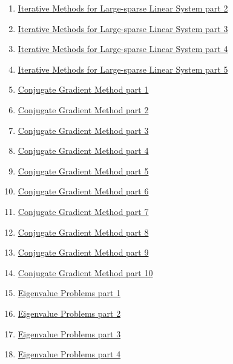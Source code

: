 \documentclass[11pt]{article}
\begin{document}
\begin{enumerate}
	\item \href{https://mp.weixin.qq.com/s/1Dzwvc6YO_hfeI2PSF2t4g}{Iterative Methods for Large-sparse Linear System part 2}	%
	\item \href{https://mp.weixin.qq.com/s/-f-D6MYmhacy6x9Q2EyagA}{Iterative Methods for Large-sparse Linear System part 3}	%
	\item \href{https://mp.weixin.qq.com/s/MeDd214wkrRroG-F_uDLfg}{Iterative Methods for Large-sparse Linear System part 4}	%
	\item \href{https://mp.weixin.qq.com/s/peWYPbvlArAoLjfw2SuaPw}{Iterative Methods for Large-sparse Linear System part 5}	%
	\item \href{https://mp.weixin.qq.com/s/8yjCO2fheoLmCAOzBIiaVQ}{Conjugate Gradient Method part 1}	%
	\item \href{https://mp.weixin.qq.com/s/tlrsJxDVutrjRr4NgwKjKQ}{Conjugate Gradient Method part 2}	%
	\item \href{https://mp.weixin.qq.com/s/YMSzlWdl8Q4gu2-nc4FR9w}{Conjugate Gradient Method part 3}	%
	\item \href{https://mp.weixin.qq.com/s/y0Rgwbc0rJET4woeaOJEOQ}{Conjugate Gradient Method part 4}	%
	\item \href{https://mp.weixin.qq.com/s/BrotVfKzWbJ_f14Sj93XpQ}{Conjugate Gradient Method part 5}	%
	\item \href{https://mp.weixin.qq.com/s/s4njWddDdjyydRFaiKi-VA}{Conjugate Gradient Method part 6}	%
	\item \href{https://mp.weixin.qq.com/s/3Fnw_4Wm63v8L_2joG6CYQ}{Conjugate Gradient Method part 7}	%
	\item \href{https://mp.weixin.qq.com/s/VF-QqmtAnK7i4wwzK6u81g}{Conjugate Gradient Method part 8}	%
	\item \href{https://mp.weixin.qq.com/s/oSs0vdcI6XsNXNLr_GbMMA}{Conjugate Gradient Method part 9}	%
	\item \href{https://mp.weixin.qq.com/s/NI_NxE-ASCT91uSpnRVzTg}{Conjugate Gradient Method part 10}	%
	\item \href{https://mp.weixin.qq.com/s/yC5d6FbALwQTz1tF-1EBTQ}{Eigenvalue Problems part 1}	%
	\item \href{https://mp.weixin.qq.com/s/l2n_NfvJ1Rbtpi2ov1ctEQ}{Eigenvalue Problems part 2}	%
	\item \href{https://mp.weixin.qq.com/s/eUspch7mfNVPdyyaDGCHxA}{Eigenvalue Problems part 3}	%
	\item \href{https://mp.weixin.qq.com/s/2DOaA8U3EwnlQdBejVypoQ}{Eigenvalue Problems part 4}	%

\end{enumerate}
\end{document}
